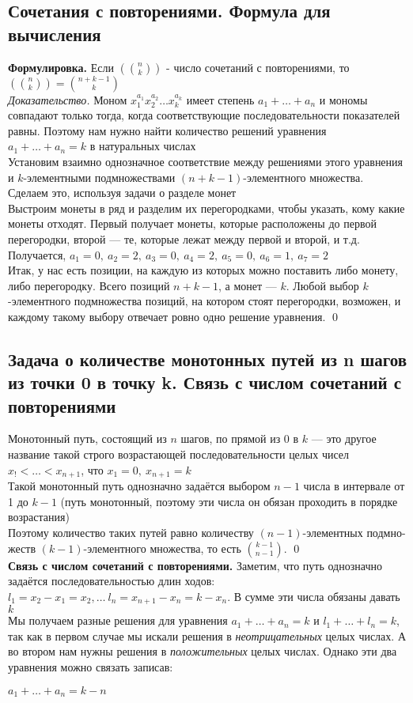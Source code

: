 \documentclass[a4paper]{article}
\begin{document}
\subsection{Сочетания с повторениями. Формула для вычисления}
\textbf{Формулировка.} Если $\left(\binom{n}{k}\right)$ - число сочетаний с повторениями, то $\left(\binom{n}{k}\right)=\binom{n+k-1}{k}$\\[2mm]
\textit{Доказательство.} Моном $x_1^{a_1}x_2^{a_2}\ldots x_k^{a_k}$ имеет степень $a_1+\ldots+a_n$ и мономы совпадают только тогда, когда соответствующие последовательности показателей равны. Поэтому нам нужно найти количество решений уравнения $a_1+\ldots+a_n=k$ в натуральных числах\\[2mm]
 Установим взаимно однозначное соответствие между решениями этого уравнения и $k$-элементными подмножествами $(n+k-1)$-элементного множества. Сделаем это, используя задачи о разделе монет\\[2mm]
 Выстроим монеты в ряд и разделим их перегородками, чтобы указать, кому какие монеты отходят. Первый получает монеты, которые расположены до первой перегородки, второй — те, которые лежат между первой и второй, и т.д. Получается, $a_1=0,\ a_2 =2,\ a_3 =0,\ a_4 =2,\ a_5 =0,\ a_6 =1,\ a_7 =2$\\[2mm]
 Итак, у нас есть позиции, на каждую из которых можно поставить либо монету, либо перегородку. Всего позиций $n+k-1$, а монет — $k$. Любой выбор $k$-элементного подмножества позиций, на котором стоят перегородки, возможен, и каждому такому выбору отвечает ровно одно решение уравнения. \qed
\subsection{Задача о количестве монотонных путей из n шагов из точки 0 в точку k. Связь с числом сочетаний с повторениями}
Монотонный путь, состоящий из $n$ шагов, по прямой из 0 в $k$ — это другое название такой строго возрастающей последовательности целых чисел $x_!<\ldots<x_{n+1}$, что $x_1=0,\ x_{n+1}=k$\\[2mm]
 Такой монотонный путь однозначно задаётся выбором $n-1$ числа в интервале от 1 до $k-1$ (путь монотонный, поэтому эти числа он обязан проходить в порядке возрастания)\\[2mm]
 Поэтому количество таких путей равно количеству $(n-1)$-элементных подмно- жеств $(k-1)$-элементного множества, то есть $\binom{k-1}{n-1}$. \qed\\[2mm]
\textbf{Связь с числом сочетаний с повторениями.} Заметим, что путь однозначно задаётся последовательностью длин ходов: $l_1=x_2-x_1=x_2,\ldots\ l_n=x_{n+1}-x_n=k-x_n$. В сумме эти числа обязаны давать $k$\\[2mm]
 Мы получаем разные решения для уравнения $a_1+\ldots+a_n=k$ и $l_1+\ldots+l_n=k$, так как в первом случае мы искали решения в \textit{неотрицательных} целых числах. А во втором нам нужны решения в \textit{положительных} целых числах. Однако эти два уравнения можно связать записав:\\[2mm]
\centerline{$a_1+\ldots+a_n=k-n$}
\end{document}
